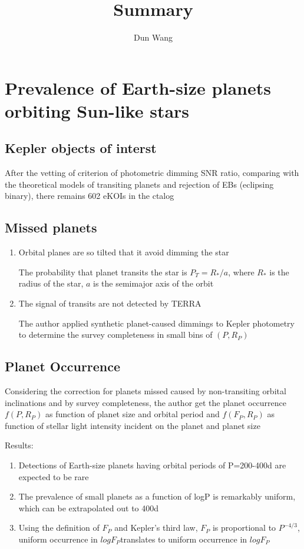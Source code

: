 \documentclass[]{article}
\begin{document}
\title{Summary}
\author{Dun Wang}
\maketitle

\section{Prevalence of Earth-size planets orbiting Sun-like stars}

\subsection{Kepler objects of interst}
After the vetting of criterion of photometric dimming SNR ratio, comparing with the theoretical models of transiting planets and rejection of EBs (eclipsing binary), there remains 602 eKOIs in the ctalog

\subsection{Missed planets}

\begin{enumerate}
 \item Orbital planes are so tilted that it avoid dimming the star

The probability that planet transits the star is $P_{T}=R_{*}/a$, where $R_{*}$ is the radius of the star, $a$ is the semimajor axis of the orbit \\

 \item The signal of transits are not detected by TERRA

The author applied synthetic planet-caused dimmings to Kepler photometry to determine the survey completeness in small bins of $(P,R_{P})$
\end{enumerate}

\subsection{Planet Occurrence}
Considering the correction for planets missed caused by non-transiting orbital inclinations and by survey completeness, the author get the planet occurrence $f(P, R_{P})$ as function of planet size and orbital period and $f(F_{P},R_{P})$ as function of stellar light intensity incident on the planet and planet size

Results:
\begin{enumerate}
 \item Detections of Earth-size planets having orbital periods of P=200-400d are expected to be rare
 \item The prevalence of small planets as a function of logP is remarkably uniform, which can be extrapolated out to 400d
 \item Using the definition of $F_{P}$ and Kepler's third law, $F_{P}$ is proportional to $P^{-4/3}$, uniform occurrence in $logF_{P}$translates to uniform occurrence in $logF_{P}$
\end{enumerate}
\end{document}
